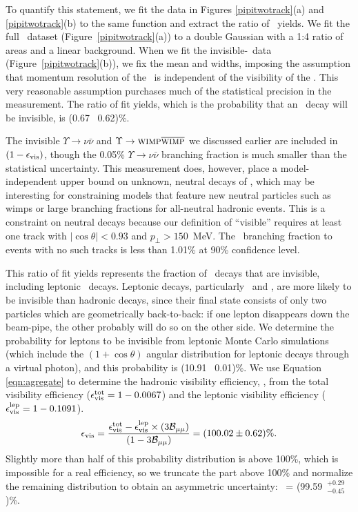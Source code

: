 \documentclass{cornell}
\begin{document}
To quantify this statement, we fit the data in Figures
\ref{pipitwotrack}(a) and \ref{pipitwotrack}(b) to the same function and
extract the ratio of \twotoone\ yields.  We fit the full \twotrack\
dataset (Figure~\ref{pipitwotrack}(a)) to a double Gaussian with a 1:4
ratio of areas and a linear background.  When we fit the
invisible-\us\ data (Figure~\ref{pipitwotrack}(b)), we fix the mean and
widths, imposing the assumption that momentum resolution of the \pipi\
is independent of the visibility of the \us.  This very reasonable
assumption purchases much of the statistical precision in the
measurement.  The ratio of fit yields, which is the probability that
an \us\ decay will be invisible, is (0.67 \PM\ 0.62)\%.

\label{pag:invisible} The invisible $\Upsilon \to \nu\bar{\nu}$ and $\Upsilon \to \mbox{\sc
wimp} \overline{\mbox{\sc wimp}}$ we discussed earlier are included in
$(1-\epsilon_{\mbox{\scriptsize vis}})$, though the 0.05\% $\Upsilon \to
\nu\bar{\nu}$ branching fraction is much smaller than the statistical
uncertainty.  This measurement does, however, place a
model-independent upper bound on unknown, neutral decays of \us, which
may be interesting for constraining models that feature new neutral
particles such as {\sc wimp}s or large branching fractions for
all-neutral hadronic events.  This is a constraint on neutral decays
because our definition of ``visible'' requires at least one track with
$|\cos\theta| < 0.93$ and $p_\perp > 150$~MeV.  The \us\ branching
fraction to events with no such tracks is less than 1.01\% at 90\%
confidence level.

This ratio of fit yields represents the fraction of \us\ decays that
are invisible, including leptonic \us\ decays.  Leptonic decays,
particularly \ee\ and \mumu, are more likely to be invisible than
hadronic decays, since their final state consists of only two
particles which are geometrically back-to-back: if one lepton
disappears down the beam-pipe, the other probably will do so on
the other side.  We determine the probability for leptons to be
invisible from leptonic Monte Carlo simulations (which include the
$(1+\cos\theta)$ angular distribution for leptonic decays through a
virtual photon), and this probability is (10.91 \PM\ 0.01)\%.  We use
Equation \ref{eqn:agregate} to determine the hadronic visibility
efficiency, \evis, from the total visibility efficiency
($\epsilon_{\mbox{\scriptsize vis}}^{\mbox{\scriptsize tot}} = 1 - 0.0067$) and the leptonic
visibility efficiency ($\epsilon_{\mbox{\scriptsize vis}}^{\mbox{\scriptsize lep}} = 1 - 0.1091$).
\begin{equation}
  \epsilon_{\mbox{\scriptsize vis}} = \frac{\epsilon_{\mbox{\scriptsize vis}}^{\mbox{\scriptsize tot}} - \epsilon_{\mbox{\scriptsize vis}}^{\mbox{\scriptsize lep}} \times (3{\mathcal B}_{\mu\mu})}{(1 - 3{\mathcal B}_{\mu\mu})}
  = (100.02 \pm 0.62)\% \mbox{.}
  \label{eqn:leptoniccorrection}
\end{equation}
Slightly more than half of this probability distribution is above
100\%, which is impossible for a real efficiency, so we truncate the
part above 100\% and normalize the remaining distribution to obtain an
asymmetric uncertainty: \evis\ = (99.59~$^{+0.29}_{-0.45}$)\%.
\end{document}
